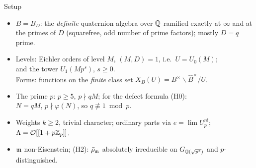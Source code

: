 \begin{frame}{Setup}
  \small
  \begin{itemize}\setlength{\itemsep}{3pt}
    \item $B=B_D$: the \emph{definite} quaternion algebra over $\mathbb{Q}$ ramified exactly at $\infty$ and at the primes of $D$
      (squarefree, odd number of prime factors); mostly $D=q$ prime.
    \item Levels: Eichler orders of level $M$, $(M,D)=1$, i.e.\ $U=U_0(M)$;\\
      and the tower $U_1(Mp^s)$, $s\ge0$.\\
      Forms: functions on the \emph{finite} class set $X_B(U)=B^\times\backslash\widehat B^\times/U$.
    \item The prime $p$: $p\ge5$, $p\nmid qM$; for the defect formula (H0):\\ $N=qM$, $p\nmid\varphi(N)$, so $q\not\equiv1\bmod p$.
    \item Weights $k\ge2$, trivial character; ordinary parts via $e=\lim U_p^{n!}$; $\Lambda=\mathcal O[[1+p\mathbb{Z}_p]]$.
    \item $\mathfrak m$ non-Eisenstein; (H2): $\bar\rho_\mathfrak m$ absolutely irreducible on $G_{\mathbb{Q}(\sqrt{p^*})}$ and $p$-distinguished.
  \end{itemize}
\end{frame}
